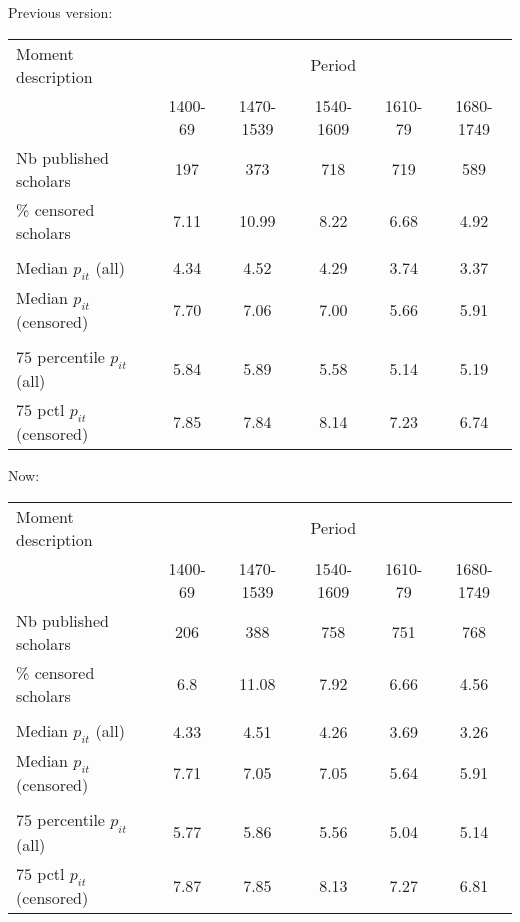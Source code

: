 \documentclass[12pt]{article}
\begin{document}
Previous version:

\begin{tabular}{lccccc}
\hline
\hline
Moment description& \multicolumn{5}{c}{Period}\\
   & 1400-69 &1470-1539 & 1540-1609 & 1610-79 & 1680-1749 \\
\hline
Nb published scholars
    &  197      &  373       &  718      &  719     &  589  \\
\% censored scholars
    &  7.11     &  10.99      &  8.22     &  6.68    &  4.92  \\
    \\
Median $p_{it}$ (all)
    &  4.34     &  4.52      &  4.29     &  3.74    &  3.37  \\
Median $p_{it}$ (censored)
    &  7.70     &  7.06      &  7.00     &  5.66    &  5.91  \\
    \\
$75$ percentile $p_{it}$ (all)
    &  5.84     &  5.89      &  5.58     &  5.14    &  5.19  \\
$75$ pctl $p_{it}$ (censored)
    &  7.85     &  7.84      &  8.14     &  7.23    &  6.74  \\
\hline
\hline
\end{tabular}

Now:

\begin{tabular}{lccccc}
\hline
\hline
Moment description& \multicolumn{5}{c}{Period}\\
   & 1400-69 &1470-1539 & 1540-1609 & 1610-79 & 1680-1749 \\
\hline
Nb published scholars
    &  206     &  388       &  758      &  751     &  768  \\
\% censored scholars
    &  6.8     &  11.08      &  7.92     &  6.66    &  4.56  \\
    \\
Median $p_{it}$ (all)
    &  4.33     &  4.51      &  4.26     &  3.69    &  3.26  \\
Median $p_{it}$ (censored)
    &  7.71     &  7.05      &  7.05     &  5.64    &  5.91  \\
    \\
$75$ percentile $p_{it}$ (all)
    &  5.77     &  5.86      &  5.56     &  5.04    &  5.14  \\
$75$ pctl $p_{it}$ (censored)
    &  7.87     &  7.85      &  8.13     &  7.27    &  6.81  \\
\hline
\hline
\end{tabular}
\newpage
\end{document}
